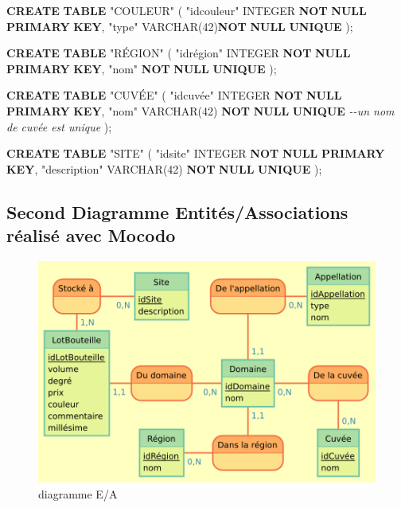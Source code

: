 \documentclass[11pt]{article}
\makeatletter
\def\maxwidth{\ifdim\Gin@nat@width>\linewidth\linewidth
    \else\Gin@nat@width\fi}
\let\Oldincludegraphics\includegraphics
\renewcommand{\includegraphics}[1]{\Oldincludegraphics[width=.8\maxwidth]{#1}}
\newenvironment{Shaded}{}{}
\newcommand{\KeywordTok}[1]{\textcolor[rgb]{0.00,0.44,0.13}{\textbf{{#1}}}}
\newcommand{\DataTypeTok}[1]{\textcolor[rgb]{0.56,0.13,0.00}{{#1}}}
\newcommand{\DecValTok}[1]{\textcolor[rgb]{0.25,0.63,0.44}{{#1}}}
\newcommand{\CommentTok}[1]{\textcolor[rgb]{0.38,0.63,0.69}{\textit{{#1}}}}
\newcommand{\OtherTok}[1]{\textcolor[rgb]{0.00,0.44,0.13}{{#1}}}
\newcommand{\NormalTok}[1]{{#1}}
\makeatother
\begin{document}
\begin{Shaded}
\begin{Highlighting}[]
\KeywordTok{CREATE} \KeywordTok{TABLE} \OtherTok{"COULEUR"}\NormalTok{ (}
  \OtherTok{"idcouleur"} \DataTypeTok{INTEGER} \KeywordTok{NOT} \KeywordTok{NULL} \KeywordTok{PRIMARY} \KeywordTok{KEY}\NormalTok{,}
  \OtherTok{"type"} \DataTypeTok{VARCHAR}\NormalTok{(}\DecValTok{42}\NormalTok{)}\KeywordTok{NOT} \KeywordTok{NULL}  \KeywordTok{UNIQUE}
\NormalTok{);}

\KeywordTok{CREATE} \KeywordTok{TABLE} \OtherTok{"RÉGION"}\NormalTok{ (}
  \OtherTok{"idrégion"}  \DataTypeTok{INTEGER} \KeywordTok{NOT} \KeywordTok{NULL} \KeywordTok{PRIMARY} \KeywordTok{KEY}\NormalTok{,}
  \OtherTok{"nom"} \KeywordTok{NOT} \KeywordTok{NULL}  \KeywordTok{UNIQUE}
\NormalTok{);}

\KeywordTok{CREATE} \KeywordTok{TABLE} \OtherTok{"CUVÉE"}\NormalTok{ (}
  \OtherTok{"idcuvée"}  \DataTypeTok{INTEGER} \KeywordTok{NOT} \KeywordTok{NULL} \KeywordTok{PRIMARY} \KeywordTok{KEY}\NormalTok{,}
  \OtherTok{"nom"} \DataTypeTok{VARCHAR}\NormalTok{(}\DecValTok{42}\NormalTok{) }\KeywordTok{NOT} \KeywordTok{NULL}  \KeywordTok{UNIQUE}                \CommentTok{{-}{-}un nom de cuvée est unique}
\NormalTok{);}

\KeywordTok{CREATE} \KeywordTok{TABLE} \OtherTok{"SITE"}\NormalTok{ (}
  \OtherTok{"idsite"} \DataTypeTok{INTEGER} \KeywordTok{NOT} \KeywordTok{NULL} \KeywordTok{PRIMARY} \KeywordTok{KEY}\NormalTok{,}
  \OtherTok{"description"} \DataTypeTok{VARCHAR}\NormalTok{(}\DecValTok{42}\NormalTok{) }\KeywordTok{NOT} \KeywordTok{NULL} \KeywordTok{UNIQUE}  
\NormalTok{);}
\end{Highlighting}
\end{Shaded}

    \hypertarget{second-diagramme-entituxe9sassociations-ruxe9alisuxe9-avec-mocodo}{%
\subsection{Second Diagramme Entités/Associations réalisé avec
Mocodo}\label{second-diagramme-entituxe9sassociations-ruxe9alisuxe9-avec-mocodo}}

\begin{figure}
\centering
\includegraphics{mocodo/Domaines/Domaines.png}
\caption{diagramme E/A}
\end{figure}
\end{document}
